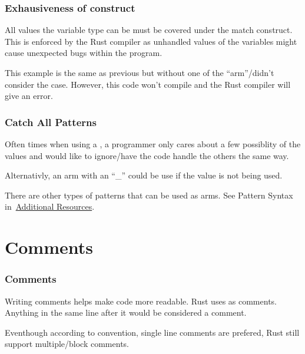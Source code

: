 \documentclass{beamer}
\begin{document}
\begin{frame}
  \frametitle{Exhausiveness of  construct}
  All values the variable type can be must be covered under the match construct. This is enforced by the Rust compiler as unhandled values of the variables might cause unexpected bugs within the program.
  
  This example is the same as previous but without one of the ``arm''/didn't consider the  case. However, this code won't compile and the Rust compiler will give an error.
\end{frame}

\begin{frame}[allowframebreaks]
  \frametitle{Catch All Patterns}
  Often times when using a , a programmer only cares about a few possiblity of the values and would like to ignore/have the code handle the others the same way.
  

  \newpage

  Alternativly, an arm with an ``\_'' could be use if the value is not being used.
  

  There are other types of patterns that can be used as  arms. See Pattern Syntax in~\hyperlink{Additional Resources}{Additional Resources}.
\end{frame}

\section{Comments}
\begin{frame}[allowframebreaks]
  \frametitle{Comments}
  Writing comments helps make code more readable. Rust uses \inlinecode{//} as comments. Anything in the same line after it would be considered a comment.
  

  Eventhough according to convention, single line comments are prefered, Rust still support multiple/block comments.
  
\end{frame}
\end{document}
